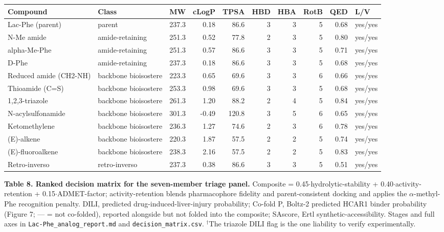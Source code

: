 \documentclass[11pt]{article}
\begin{document}
{\footnotesize
\begin{longtable}{llrrrrrrrl}
\toprule
\textbf{Compound} & \textbf{Class} & \textbf{MW} & \textbf{cLogP} & \textbf{TPSA} & \textbf{HBD} & \textbf{HBA} & \textbf{RotB} & \textbf{QED} & \textbf{L/V} \\
\midrule\endhead
Lac-Phe (parent) & parent & 237.3 & 0.18 & 86.6 & 3 & 3 & 5 & 0.68 & yes/yes \\
N-Me amide & amide-retaining & 251.3 & 0.52 & 77.8 & 2 & 3 & 5 & 0.80 & yes/yes \\
alpha-Me-Phe & amide-retaining & 251.3 & 0.57 & 86.6 & 3 & 3 & 5 & 0.71 & yes/yes \\
D-Phe & amide-retaining & 237.3 & 0.18 & 86.6 & 3 & 3 & 5 & 0.68 & yes/yes \\
Reduced amide (CH2-NH) & backbone bioisostere & 223.3 & 0.65 & 69.6 & 3 & 3 & 6 & 0.66 & yes/yes \\
Thioamide (C=S) & backbone bioisostere & 253.3 & 0.98 & 69.6 & 3 & 3 & 5 & 0.68 & yes/yes \\
1,2,3-triazole & backbone bioisostere & 261.3 & 1.20 & 88.2 & 2 & 4 & 5 & 0.84 & yes/yes \\
N-acylsulfonamide & backbone bioisostere & 301.3 & -0.49 & 120.8 & 3 & 5 & 6 & 0.65 & yes/yes \\
Ketomethylene & backbone bioisostere & 236.3 & 1.27 & 74.6 & 2 & 3 & 6 & 0.78 & yes/yes \\
(E)-alkene & backbone bioisostere & 220.3 & 1.87 & 57.5 & 2 & 2 & 5 & 0.74 & yes/yes \\
(E)-fluoroalkene & backbone bioisostere & 238.3 & 2.16 & 57.5 & 2 & 2 & 5 & 0.83 & yes/yes \\
Retro-inverso & retro-inverso & 237.3 & 0.38 & 86.6 & 3 & 3 & 5 & 0.51 & yes/yes \\
\bottomrule
\end{longtable}
}



\textbf{Table 8. Ranked decision matrix for the seven-member triage panel.} Composite = 0.45$\cdot$hydrolytic-stability + 0.40$\cdot$activity-retention + 0.15$\cdot$ADMET-factor; activity-retention blends pharmacophore fidelity and parent-consistent docking and applies the $\alpha$-methyl-Phe recognition penalty. DILI, predicted drug-induced-liver-injury probability; Co-fold P, Boltz-2 predicted HCAR1 binder probability (Figure 7; --- = not co-folded), reported alongside but not folded into the composite; SAscore, Ertl synthetic-accessibility. Stages and full axes in \texttt{Lac-Phe\_analog\_report.md} and \texttt{decision\_matrix.csv}. $^\dagger$The triazole DILI flag is the one liability to verify experimentally.
\end{document}
